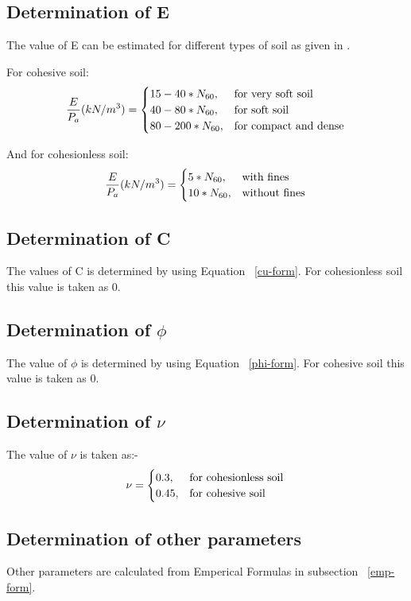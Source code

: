 \subsection{Determination of E}
The value of E can be estimated for different types of soil as given in \cite{kulhawy_manual_1990}.
\par
For cohesive soil:
\begin{equation}
\frac{E}{P_a}(kN/m^3)= \begin{cases}
    15-40 * N_{60}, & \text{for very soft soil}\\
    40-80 * N_{60}, & \text{for soft soil}\\
    80-200 * N_{60}, & \text{for compact and dense}
    \end{cases}\\
\end{equation}
\par
And for cohesionless soil:
\begin{equation}
\frac{E}{P_a}(kN/m^3)= \begin{cases}
    5 * N_{60}, & \text{with fines}\\
    10 * N_{60}, & \text{without fines}
    \end{cases}\\
\end{equation}

\subsection{Determination of C}
The values of C is determined by using Equation ~\ref{cu-form}. For cohesionless soil this value is taken as 0.

\subsection{Determination of $\phi$}
The value of $\phi$ is determined by using Equation ~\ref{phi-form}. For cohesive soil this value is taken as 0.

\subsection{Determination of $\nu$}
The value of $\nu$ is taken as:-
\begin{equation}
\nu= \begin{cases}
    0.3, & \text{for cohesionless soil}\\
    0.45, & \text{for cohesive soil}
    \end{cases}\\
\end{equation}

\subsection{Determination of other parameters}
Other parameters are calculated from Emperical Formulas in subsection ~\ref{emp-form}.